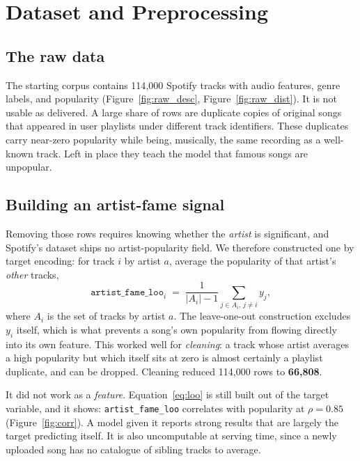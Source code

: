 \documentclass[10pt,twocolumn]{article}
\begin{document}
\section{Dataset and Preprocessing}

\subsection{The raw data}

The starting corpus contains 114{,}000 Spotify tracks with audio features,
genre labels, and popularity (Figure~\ref{fig:raw_desc},
Figure~\ref{fig:raw_dist}). It is not usable as delivered. A large share of rows
are duplicate copies of original songs that appeared in user playlists under
different track identifiers. These duplicates carry near-zero popularity while
being, musically, the same recording as a well-known track. Left in place they
teach the model that famous songs are unpopular.

\subsection{Building an artist-fame signal}

Removing those rows requires knowing whether the \emph{artist} is significant,
and Spotify's dataset ships no artist-popularity field. We therefore constructed
one by target encoding: for track $i$ by artist $a$, average the popularity of
that artist's \emph{other} tracks,
\begin{equation}
\texttt{artist\_fame\_loo}_i \;=\; \frac{1}{|A_i| - 1}\sum_{j \in A_i,\, j \neq i} y_j ,
\label{eq:loo}
\end{equation}
where $A_i$ is the set of tracks by artist $a$. The leave-one-out construction
excludes $y_i$ itself, which is what prevents a song's own popularity from
flowing directly into its own feature. This worked well for \emph{cleaning}: a
track whose artist averages a high popularity but which itself sits at zero is
almost certainly a playlist duplicate, and can be dropped. Cleaning reduced
114{,}000 rows to \textbf{66{,}808}.

It did not work as a \emph{feature}. Equation~\ref{eq:loo} is still built out of
the target variable, and it shows: \texttt{artist\_fame\_loo} correlates with
popularity at $\rho = 0.85$ (Figure~\ref{fig:corr}). A model given it reports
strong results that are largely the target predicting itself. It is also
uncomputable at serving time, since a newly uploaded song has no catalogue of
sibling tracks to average.
\end{document}
